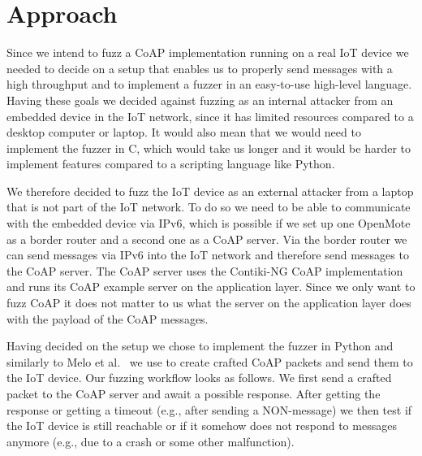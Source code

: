 \section{Approach}
\label{section:approach}


Since we intend to fuzz a CoAP implementation running on a real IoT device we needed to decide on a setup that enables us to properly send messages with a high throughput and to implement a fuzzer in an easy-to-use high-level language. Having these goals we decided against fuzzing as an internal attacker from an embedded device in the IoT network, since it has limited resources compared to a desktop computer or laptop. It would also mean that we would need to implement the fuzzer in C, which would take us longer and it would be harder to implement features compared to a scripting language like Python.

We therefore decided to fuzz the IoT device as an external attacker from a laptop that is not part of the IoT network. To do so we need to be able to communicate with the embedded device via IPv6, which is possible if we set up one OpenMote as a border router and a second one as a CoAP server. Via the border router we can send messages via IPv6 into the IoT network and therefore send messages to the CoAP server. The CoAP server uses the Contiki-NG CoAP implementation and runs its CoAP example server on the application layer. Since we only want to fuzz CoAP it does not matter to us what the server on the application layer does with the payload of the CoAP messages.

Having decided on the setup we chose to implement the fuzzer in Python and similarly to Melo et al.~\cite{Melo2017RobustnessTO} we use \scapy to create crafted CoAP packets and send them to the IoT device. Our fuzzing workflow looks as follows. We first send a crafted packet to the CoAP server and await a possible response. After getting the response or getting a timeout (e.g., after sending a NON-message) we then test if the IoT device is still reachable or if it somehow does not respond to messages anymore (e.g., due to a crash or some other malfunction). 

